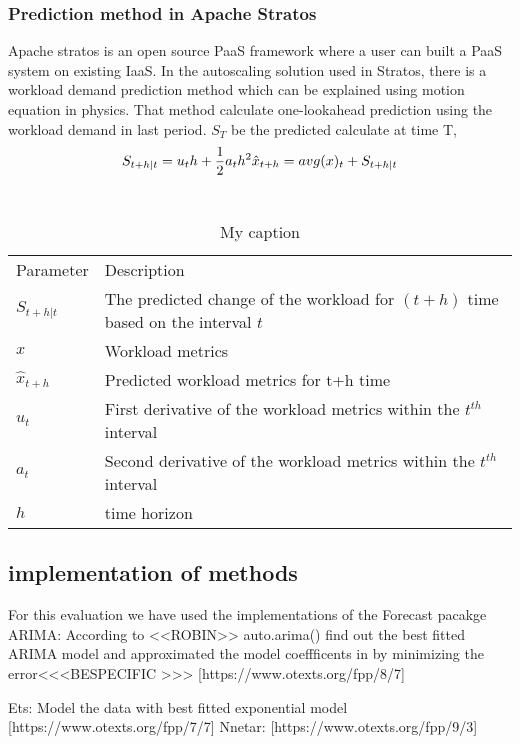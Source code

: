 \subsubsection{Prediction method in Apache Stratos}

Apache stratos is an open source PaaS framework where a user can built a PaaS system on existing IaaS. In the autoscaling solution used in Stratos, there is a workload demand prediction method which can be explained using motion equation in physics. That method calculate one-lookahead prediction using the workload demand in last period.
$S_T$ be the predicted  calculate at time T, 
$$S_{t+h|t} = u_{t}h+ \frac{1}{2} a_{t}h^2 \\
\hat{x}_{t+h}=avg(x)_{t}  + S_{t+h|t}$$ \\

\begin{table}[]
\centering
\caption{My caption}
\label{my-label}
\begin{tabular}{ll}
Parameter       & Description                                                                     \\
$S_{t+h|t}$     & The predicted change of the workload for $(t+h)$ time based on the interval $t$ \\
$x$             & Workload metrics                                                                \\
$\hat{x}_{t+h}$ & Predicted workload metrics for t+h time                                         \\
$u_{t}$         & First derivative of the workload metrics within the $t^{th}$ interval           \\
$a_{t}$         & Second derivative of the workload metrics within the $t^{th}$ interval          \\
$h$             & time horizon                                                                   
\end{tabular}
\end{table}



\subsection{implementation of methods}
For this evaluation we have used the implementations of the Forecast pacakge \cite{forecastPackage}
ARIMA: According to <<ROBIN>> auto.arima()  find out the best fitted ARIMA model and approximated the model coeffficents in by minimizing the error<<<BESPECIFIC >>> [https://www.otexts.org/fpp/8/7]

Ets: Model the data with best fitted exponential model [https://www.otexts.org/fpp/7/7]
    \cite{Wagner_2011}
	Nnetar: [https://www.otexts.org/fpp/9/3]
